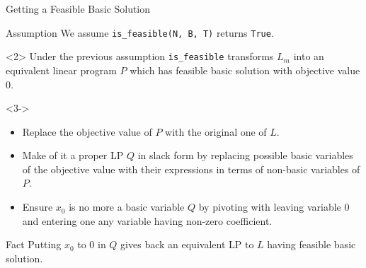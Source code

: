 \documentclass[32pt, aspectratio = 169]{beamer}
\begin{document}
\begin{frame}{Getting a Feasible Basic Solution}
  \begin{halfshyblock}{Assumption}
    We assume \texttt{is_feasible(N, B, T)} returns
    \texttt{True}.
  \end{halfshyblock}
  \vspace{.5\baselineskip}
  \begin{overlayarea}{\textwidth}{.6\textheight}
    \begin{onlyenv}<2>
      Under the previous assumption \texttt{is_feasible}
      transforms $L_m$ into an equivalent linear program $P$ which has
      feasible basic solution with objective value $0$.
    \end{onlyenv}
    \begin{onlyenv}<3->
      \begin{itemize}
      \item<3-> Replace the objective value of $P$ with the original one of $L$.
      \item<4-> Make of it a proper LP $Q$ in slack form by replacing
        possible basic variables of the objective value with their
        expressions in terms of non-basic variables of $P$.
      \item<5-> Ensure $x_0$ is no more a basic variable $Q$ by
        pivoting with leaving variable $0$ and entering one any
        variable having non-zero coefficient.
      \end{itemize}
      \pause[6]
      \vspace{.5\baselineskip}
      \begin{halfshyblock}{Fact}
        Putting $x_0$ to $0$ in $Q$ gives back an equivalent LP to $L$
        having feasible basic solution.
      \end{halfshyblock}
    \end{onlyenv}
  \end{overlayarea}
\end{frame}
\end{document}
